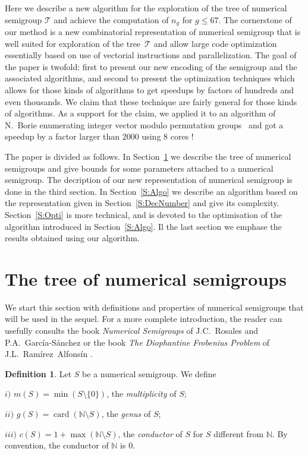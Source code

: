 \documentclass[reqno,11pt]{amsart}
\theoremstyle{plain}
\theoremstyle{definition}
\newtheorem{defi}[prop]{Definition}
\renewcommand{\leq}{\leqslant}
\newcommand{\NN}{\mathbb{N}}
\DeclareMathOperator{\card}{card}
\begin{document}
Here we describe a new algorithm for the exploration of the tree of numerical
semigroup $\mathcal{T}$ and achieve the computation of $n_g$ for $g\leq 67$.
The cornerstone of our method is a new combinatorial representation of
numerical semigroup that is well suited for exploration of the
tree~$\mathcal{T}$ and allow large code optimization essentially based on use of
vectorial instructions and parallelization.
The goal of the paper is twofold:
first to present our new encoding of the semigroup and the associated
algorithms, and second to present the optimization techniques which allows for
those kinds of algorithms to get speedups by factors of hundreds and even
thousands. We claim that these technique are fairly general for those kinds of
algorithms. As a support for the claim, we applied it to an algorithm of
N.~Borie enumerating integer vector modulo permutation groups~\cite{Borie} and
got a speedup by a factor larger than 2000 using 8 cores !

The paper is divided as follows.
In Section~\ref{S:Tree} we describe the tree of numerical semigroups and give bounds for some parameters attached to a numerical semigroup.
The decription of our new representation of numerical semigroup is done in the third section.
In Section~\ref{S:Algo} we describe an algorithm based on the representation given in Section~\ref{S:DecNumber} and give its complexity. 
Section~\ref{S:Opti} is more technical, and is devoted to the optimisation of the algorithm introduced in Section~\ref{S:Algo}.
Il the last section we emphase the results obtained using our algorithm.

\section{The tree of numerical semigroups}
\label{S:Tree}

We start this section with definitions and properties of numerical semigroups that will be used in the sequel.
For a more complete introduction, the reader can usefully consults the book \emph{Numerical Semigroups} of J.C.~Rosales and P.A.~Garc\'ia-S\'anchez \cite{BookNS} or the book \emph{The Diophantine Frobenius Problem} of J.L.~Ram\'irez~Alfons\'in \cite{BookDFP}.

\begin{defi}
Let $S$ be a numerical semigroup. We define 

$i)$ $m(S)=\min(S\setminus\{0\})$, the \emph{multiplicity} of $S$;

$ii)$ $g(S)=\card(\NN\setminus S)$, the \emph{genus} of $S$;

$iii)$ $c(S)=1+\max(\NN\setminus S)$, the \emph{conductor} of $S$ for $S$ different from $\NN$. By convention, the conductor of $\NN$ is $0$. 
\end{defi}
\end{document}
